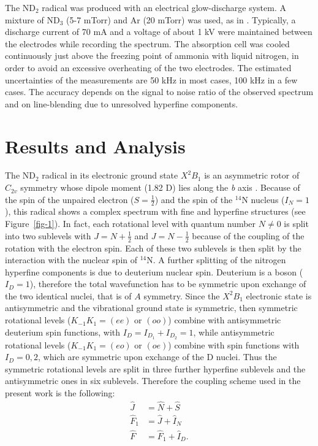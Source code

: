 \documentclass[twocolumn]{aastex61}
\begin{document}
The ND$_{2}$ radical was produced with an electrical glow-discharge system. A mixture of ND$_{3}$ (5-7 mTorr) and Ar (20 mTorr) 
was used, as in \citet{Kan91}.
Typically, a discharge current of 70 mA and a voltage of about 1 kV were maintained between the electrodes while recording the spectrum.
The absorption cell was cooled continuously just above the freezing point of ammonia with liquid nitrogen, in order to avoid an excessive 
overheating of the two electrodes.
The estimated uncertainties of the measurements are 50 kHz in most cases, 100 kHz in a few cases. The accuracy depends on the signal 
to noise ratio of the observed spectrum and on line-blending due to unresolved hyperfine components.

\section{Results and Analysis}
The ND$_{2}$ radical in its electronic ground state $X^{2}B_{1}$ is an asymmetric rotor of $C_{2v}$ symmetry whose dipole moment (1.82 D)
lies along the \emph{b} axis \citep{Bro79}.
Because of the spin of the unpaired electron ($S=\frac{1}{2}$) and the spin of the $^{14}$N nucleus ($I_N=1$), this radical shows a complex
spectrum with fine and hyperfine structures (see Figure~\ref{fig-1}).
In fact, each rotational level with quantum number $N\neq0$ is split into two sublevels with $J=N+\frac{1}{2}$ and $J=N-\frac{1}{2}$
because of the coupling of the rotation with the electron spin.
Each of these two sublevels is then split by the interaction with the nuclear spin of $^{14}$N. A further splitting of the nitrogen hyperfine
components is due to deuterium nuclear spin. Deuterium is a boson ($I_D=1$), therefore the total wavefunction has to be symmetric upon
exchange of the two identical nuclei, that is of $A$ symmetry. Since the $X^{2}B_{1}$ electronic state
is antisymmetric and the vibrational ground state is symmetric, then  symmetric rotational levels ($K_{-1}K_{1}=(ee)$ or $(oo)$) 
combine with antisymmetric deuterium spin functions, with $I_{D}=I_{D_1}+I_{D_2} = 1$, while antisymmetric rotational levels 
($K_{-1}K_{1}=(eo)$ or $(oe)$) combine with spin functions with $I_D= 0, 2$, which are symmetric upon exchange of the D nuclei.
Thus the symmetric rotational levels are split in three further hyperfine sublevels and the antisymmetric ones in six sublevels.
Therefore the coupling scheme used in the present work is the following:
\begin{equation*}\begin{split}
   \hat{J} &= \hat{N}+\hat{S} \\
   \hat{F}_{1} &= \hat{J}+\hat{I}_{N} \\
   \hat{F} &= \hat{F}_{1}+\hat{I}_{D}.\\
\end{split}\end{equation*}
\end{document}
